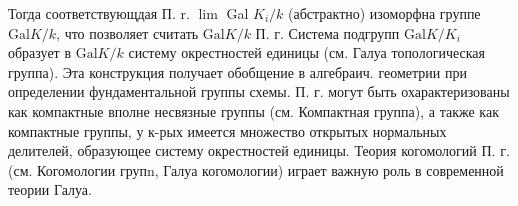 \documentclass[10pt]{article}
\begin{document}
Тогда соответствующдая П. r. $\lim$ Gal $K_{i} / k$ (абстрактно) изоморфна группе $\mathrm{Gal} K / k$, что позволяет считать $\mathrm{Gal} K / k$ П. г. Система подгрупп $\mathrm{Gal} K / K_{i}$ образует в $\mathrm{Gal} K / k$ систему окрестностей единицы (см. Галуа топологическая группа). Эта конструкция получает обобщение в алгебраич. геометрии при определении фундаментальной группы схемы. П. г. могут быть охарактеризованы как компактные вполне несвязные группы (см. Компактная группа), а также как компактные группы, у к-рых имеется множество открытых нормальных делителей, образующее систему окрестностей единицы. Теория когомологий П. г. (см. Когомологии групn, Галуа когомологии) играет важную роль в современной теории Галуа.
\end{document}

